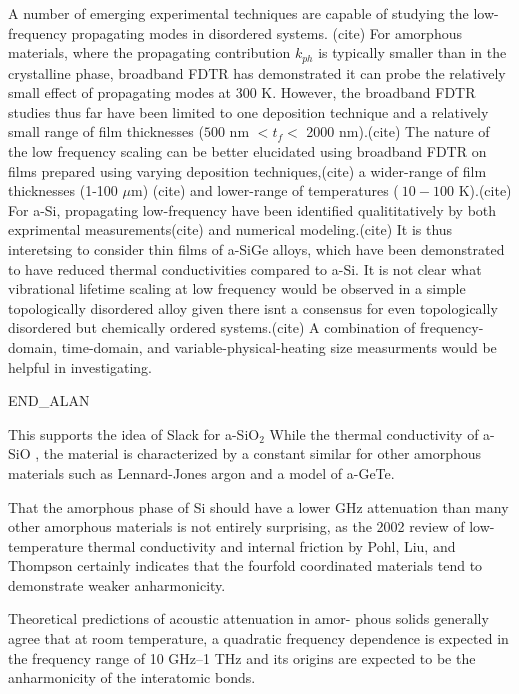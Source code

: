 \documentclass[aps,prb,twocolumn,superscriptaddress,footinbib,amsmath,amssymb,floatfix]{revtex4}
\begin{document}
{{A number of emerging experimental techniques are capable of 
studying the low-frequency propagating modes in disordered systems.
(cite) For amorphous materials, where the propagating contribution $k_{ph}$ 
is typically smaller than in the crystalline phase, broadband FDTR has demonstrated 
it can probe the relatively small effect of propagating modes at 300 K.  
However, the broadband FDTR studies thus far have been limited to one 
deposition technique and a relatively small range of film thicknesses 
($500$ nm $<t_{f}<$ 2000 nm).(cite) 
The nature of the low frequency scaling can be better elucidated using  
broadband FDTR on films prepared using 
varying deposition techniques,(cite) 
a wider-range of film thicknesses (1-100 $\mu$m)
(cite) 
and lower-range of temperatures ($~10-100$ K).(cite)
For a-Si, propagating low-frequency have been identified qualititatively by 
both exprimental measurements(cite) and numerical modeling.(cite) 
It is thus interetsing to consider thin films of a-SiGe alloys, which have been 
demonstrated to have reduced thermal conductivities compared to a-Si.
\cite{feldman_thermal_1993} It is not clear what vibrational lifetime scaling 
at low frequency would be observed in a simple topologically disordered alloy 
given there isnt a consensus for even topologically disordered but chemically 
ordered systems.(cite) A combination of frequency-domain, time-domain, and 
variable-physical-heating size measurments would be helpful in investigating.
\cite{koh_frequency_2007,siemens_quasi-ballistic_2010,
minnich_thermal_2011,regner_broadband_2013}

END_ALAN

This supports the idea of Slack for a-SiO$_2$\cite{slack_thermal_1979}
While the thermal conductivity of a-SiO , the material is characterized by 
a constant similar for other amorphous
materials such as Lennard-Jones argon\cite{larkin_predicting_2013} 
and a model of a-GeTe.\cite{sosso_thermal_2012}

That the amorphous phase
of Si should have a lower GHz attenuation than many other
amorphous materials is not entirely surprising, as the 2002
review of low-temperature thermal conductivity and internal
friction by Pohl, Liu, and Thompson certainly indicates that
the fourfold coordinated materials tend to demonstrate weaker
anharmonicity.\cite{pohl_low-temperature_2002}

Theoretical predictions of acoustic attenuation in amor-
phous solids generally agree that at room temperature, a
quadratic frequency dependence is expected in the frequency
range of 10 GHz–1 THz and its origins are expected to be
the anharmonicity of the interatomic bonds.



}}
\end{document}
